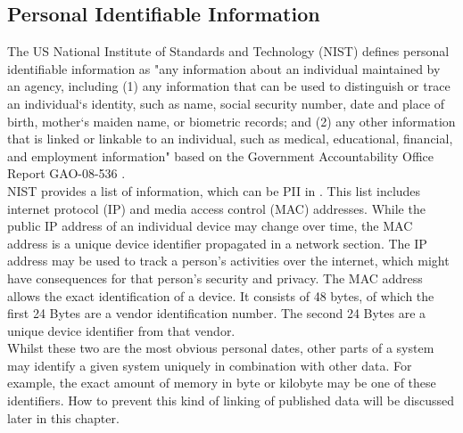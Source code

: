     \subsection{Personal Identifiable Information}
        \label{subsec:related:pii}
        The US National Institute of Standards and Technology (NIST) defines personal identifiable information as "any information about an individual maintained by an agency, including (1) any information that can be used to distinguish or trace an individual‘s identity, such as name, social security number, date and place of birth, mother‘s maiden name, or biometric records; and (2) any other information that is linked or linkable to an individual, such as medical, educational, financial, and employment information"  \cite{mccallister_guide_2010} based on the Government Accountability Office Report GAO-08-536  \cite{government_accountability_office_privacy_2008}.\\
        NIST provides a list of information, which can be PII in   \cite{mccallister_guide_2010}. This list includes internet protocol (IP) and media access control (MAC) addresses. While the public IP address of an individual device may change over time, the MAC address is a unique device identifier propagated in a network section.
        The IP address may be used to track a person's activities over the internet, which might have consequences for that person's security and privacy. 
        The MAC address allows the exact identification of a device. It consists of 48 bytes, of which the first 24 Bytes are a vendor identification number. The second 24 Bytes are a unique device identifier from that vendor.\\
        Whilst these two are the most obvious personal dates, other parts of a system may identify 
        a given system uniquely in combination with other data. For example, the exact amount of memory in byte or kilobyte may be one of these identifiers. How to prevent this kind of linking of published data will be discussed later in this chapter.\\
        
